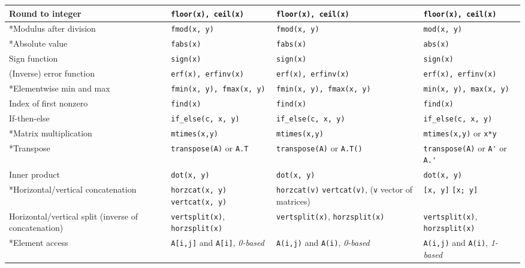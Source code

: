 \documentclass[a4paper,12pt]{book}
\begin{document}
\begin{center}
\begin{tabular}{| p{3.5cm} | p{3.5cm} | p{3.5cm} | p{3.5cm} | }
    Round to integer
    & \verb|floor(x), ceil(x)| & \verb|floor(x), ceil(x)| & \verb|floor(x), ceil(x)| \\ \hline
    *Modulus after division
    & \verb|fmod(x, y)| & \verb|fmod(x, y)| & \verb|mod(x, y)| \\ \hline
    *Absolute value
    & \verb|fabs(x)| & \verb|fabs(x)| & \verb|abs(x)| \\ \hline
    Sign function
    & \verb|sign(x)| & \verb|sign(x)| & \verb|sign(x)| \\ \hline
    (Inverse) error function
    & \verb|erf(x), erfinv(x)| & \verb|erf(x), erfinv(x)| & \verb|erf(x), erfinv(x)| \\ \hline
    *Elementwise min and max
    & \verb|fmin(x, y), fmax(x, y)| & \verb|fmin(x, y), fmax(x, y)| & \verb|min(x, y), max(x, y)| \\ \hline
    Index of first nonzero
    & \verb|find(x)| & \verb|find(x)| & \verb|find(x)| \\ \hline
    If-then-else
    & \verb|if_else(c, x, y)| & \verb|if_else(c, x, y)| & \verb|if_else(c, x, y)| \\ \hline
    *Matrix multiplication
    & \verb|mtimes(x,y)| & \verb|mtimes(x,y)| & \verb|mtimes(x,y)| or \verb|x*y| \\ \hline
    *Transpose
    & \verb|transpose(A)| or \verb|A.T| & \verb|transpose(A)| or \verb|A.T()|& \verb|transpose(A)| or \verb|A'| or \verb|A.'| \\ \hline
    Inner product
    & \verb|dot(x, y)| & \verb|dot(x, y)| & \verb|dot(x, y)| \\ \hline
    *Horizontal/vertical concatenation
    & \verb|horzcat(x, y)| \linebreak \verb|vertcat(x, y)|
    & \verb|horzcat(v)| \verb|vertcat(v)|, \linebreak (\verb|v| vector of matrices)
    & \verb|[x, y]| \linebreak \verb|[x; y]| \\ \hline
    Horizontal/vertical split (inverse of concatenation)
    & \verb|vertsplit(x)|, \verb|horzsplit(x)| & \verb|vertsplit(x)|, \verb|horzsplit(x)| & \verb|vertsplit(x)|, \verb|horzsplit(x)| \\ \hline
    *Element access
    & \verb|A[i,j]| and \verb|A[i]|, \linebreak \emph{0-based}
    & \verb|A(i,j)| and \verb|A(i)|, \linebreak \emph{0-based}
    & \verb|A(i,j)| and \verb|A(i)|, \linebreak \emph{1-based} \\ \hline

\end{tabular}
\end{center}
\end{document}
